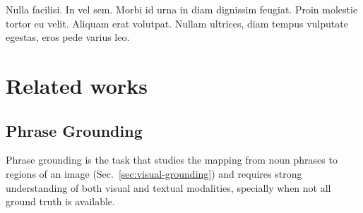 \begin{savequote}[75mm]
Nulla facilisi. In vel sem. Morbi id urna in diam dignissim feugiat. Proin molestie tortor eu velit. Aliquam erat volutpat. Nullam ultrices, diam tempus vulputate egestas, eros pede varius leo.
\end{savequote}

\chapter{Related works}

\section{Phrase Grounding}

Phrase grounding is the task that studies the mapping from noun
phrases to regions of an image (Sec.~\ref{sec:visual-grounding}) and
requires strong understanding of both visual and textual modalities,
specially when not all ground truth is available. 

